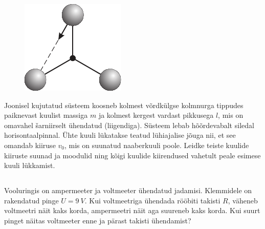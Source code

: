 \documentclass[10pt, twoside]{article}
\begin{document}
{
\begin{figure}
	\begin{center}
		\vspace{-25pt}
		\includegraphics[width=\linewidth]{2006-v3g-10-yl}
	\end{center}
\end{figure}
Joonisel kujutatud süsteem koosneb kolmest võrdkülgse kolmnurga tippudes paiknevast kuulist massiga $m$ ja kolmest kergest vardast pikkusega $l$, mis on omavahel šarniirselt ühendatud (liigendiga). Süsteem lebab hõõrdevabalt siledal horisontaalpinnal. Ühte kuuli lükatakse teatud lühiajalise jõuga nii, et see omandab kiiruse $v_0$, mis on suunatud naaberkuuli poole. Leidke teiste kuulide kiiruste suunad ja moodulid ning kõigi kuulide kiirendused vahetult peale esimese kuuli lükkamist.
\probend
\bigskip
\newpage\subsection{\protect{}}


Vooluringis on ampermeeter ja voltmeeter ühendatud jadamisi. Klemmidele on rakendatud pinge $U = \SI{9}{V}$. Kui voltmeetriga ühendada rööbiti takisti $R$, väheneb voltmeetri näit kaks korda, ampermeetri näit aga suureneb kaks korda. Kui suurt pinget näitas voltmeeter enne ja pärast takisti ühendamist?

}
\end{document}
